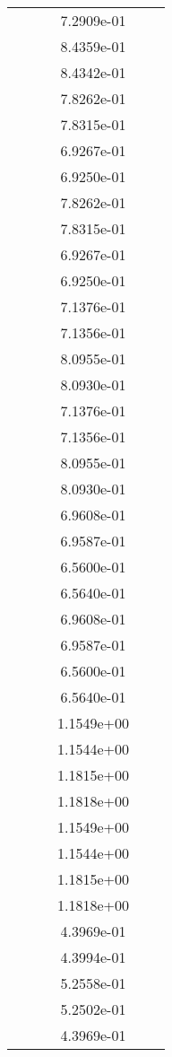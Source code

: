 \begin{xltabular}{\textwidth}{r|rS[table-format=1.3e+2]S[table-format=1.4e+2]S[table-format=1.4e+2]S[table-format=-1.5]}
&  &  & 7.2909e-01 & & \\
&  &  & 8.4359e-01 & & \\
&  &  & 8.4342e-01 & & \\
&  &  & 7.8262e-01 & & \\
&  &  & 7.8315e-01 & & \\
&  &  & 6.9267e-01 & & \\
&  &  & 6.9250e-01 & & \\
&  &  & 7.8262e-01 & & \\
&  &  & 7.8315e-01 & & \\
&  &  & 6.9267e-01 & & \\
&  &  & 6.9250e-01 & & \\
&  &  & 7.1376e-01 & & \\
&  &  & 7.1356e-01 & & \\
&  &  & 8.0955e-01 & & \\
&  &  & 8.0930e-01 & & \\
&  &  & 7.1376e-01 & & \\
&  &  & 7.1356e-01 & & \\
&  &  & 8.0955e-01 & & \\
&  &  & 8.0930e-01 & & \\
&  &  & 6.9608e-01 & & \\
&  &  & 6.9587e-01 & & \\
&  &  & 6.5600e-01 & & \\
&  &  & 6.5640e-01 & & \\
&  &  & 6.9608e-01 & & \\
&  &  & 6.9587e-01 & & \\
&  &  & 6.5600e-01 & & \\
&  &  & 6.5640e-01 & & \\
&  &  & 1.1549e+00 & & \\
&  &  & 1.1544e+00 & & \\
&  &  & 1.1815e+00 & & \\
&  &  & 1.1818e+00 & & \\
&  &  & 1.1549e+00 & & \\
&  &  & 1.1544e+00 & & \\
&  &  & 1.1815e+00 & & \\
&  &  & 1.1818e+00 & & \\
&  &  & 4.3969e-01 & & \\
&  &  & 4.3994e-01 & & \\
&  &  & 5.2558e-01 & & \\
&  &  & 5.2502e-01 & & \\
&  &  & 4.3969e-01 & & \\

\end{xltabular}
